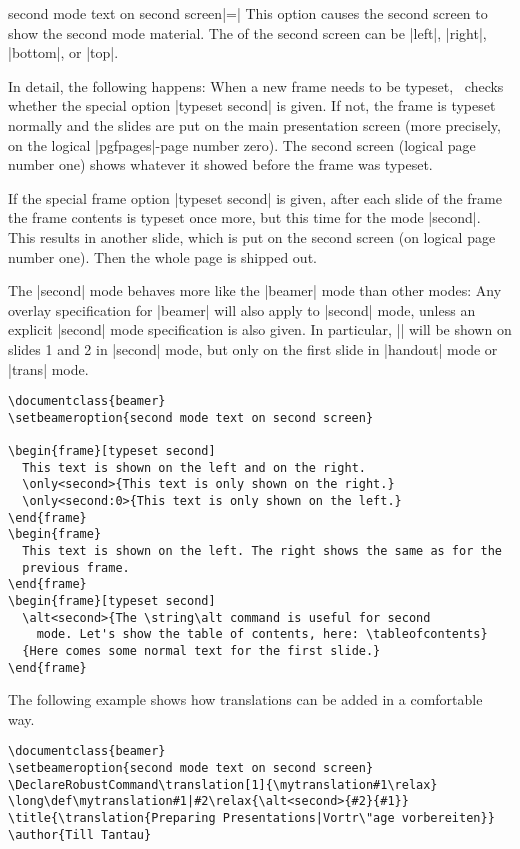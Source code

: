 \begin{beameroption}{second mode text on second screen}{|=|}
  This option causes the second screen to show the second mode material. The  of the second screen can be |left|, |right|, |bottom|, or |top|.

  In detail, the following happens: When a new frame needs to be typeset, \beamer\ checks whether the special option |typeset second| is given. If not, the frame is typeset normally and the slides are put on the main presentation screen (more precisely, on the logical |pgfpages|-page number zero). The second screen (logical page number one) shows whatever it showed before the frame was typeset.

  If the special frame option |typeset second| is given, after each slide of the frame the frame contents is typeset once more, but this time for the mode |second|. This results in another slide, which is put on the second screen (on logical page number one). Then the whole page is shipped out.

  The |second| mode behaves more like the |beamer| mode than other modes: Any overlay specification for |beamer| will also apply to |second| mode, unless an explicit |second| mode specification is also given. In particular, || will be shown on slides 1 and 2 in |second| mode, but only on the first slide in |handout| mode or |trans| mode.

  \example
\begin{verbatim}
\documentclass{beamer}
\setbeameroption{second mode text on second screen}

\begin{frame}[typeset second]
  This text is shown on the left and on the right.
  \only<second>{This text is only shown on the right.}
  \only<second:0>{This text is only shown on the left.}
\end{frame}
\begin{frame}
  This text is shown on the left. The right shows the same as for the
  previous frame.
\end{frame}
\begin{frame}[typeset second]
  \alt<second>{The \string\alt command is useful for second
    mode. Let's show the table of contents, here: \tableofcontents}
  {Here comes some normal text for the first slide.}
\end{frame}

\end{verbatim}

  \example
  The following example shows how translations can be added in a comfortable way.
\begin{verbatim}
\documentclass{beamer}
\setbeameroption{second mode text on second screen}
\DeclareRobustCommand\translation[1]{\mytranslation#1\relax}
\long\def\mytranslation#1|#2\relax{\alt<second>{#2}{#1}}
\title{\translation{Preparing Presentations|Vortr\"age vorbereiten}}
\author{Till Tantau}


\end{verbatim}
\end{beameroption}
